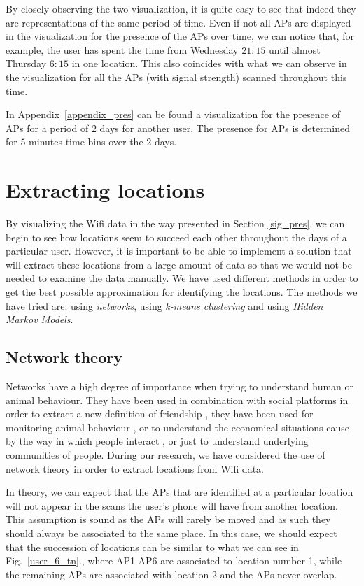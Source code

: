 By closely observing the two visualization, it is quite easy to see that indeed
they are representations of the same period of time. Even if not all APs are
displayed in the visualization for the presence of the APs over time, we can
notice that, for example, the user has spent the time from Wednesday $21:15$
until almost Thursday $6:15$ in one location. This also coincides with what we
can observe in the visualization for all the APs (with signal strength) scanned
throughout this time.

In Appendix~\ref{appendix_pres} can be found a visualization for the presence
of APs for a period of $2$ days for another user. The presence for APs is determined for $5$
minutes time bins over the $2$ days.

\section{Extracting locations}

By visualizing the Wifi data in the way presented in Section \ref{sig_pres}, we
can begin to see how locations seem to succeed each other throughout the days of
a particular user. However, it is important to be able to implement a solution
that will extract these locations from a large amount of data so that we would
not be needed to examine the data manually. We have used different methods in
order to get the best possible approximation for identifying the locations. The
methods we have tried are: using \textit{networks}, using \textit{k-means
clustering} and using \textit{Hidden Markov Models}.

\subsection{Network theory}

Networks have a high degree of importance when trying to understand human or
animal behaviour. They have been used in combination with social platforms in
order to extract a new definition of friendship \cite{cho2011friendship}, they
have been used for monitoring animal behaviour \cite{4116628}, or to understand
the economical situations cause by the way in which people interact
\cite{Copic05identifyingcommunity}, or just to understand underlying communities
of people. During our research, we have considered the use of network theory in
order to extract locations from Wifi data.

In theory, we can expect that the APs that are identified at a particular
location will not appear in the scans the user's phone will have from another
location. This assumption is sound as the APs will rarely be moved and as such
they should always be associated to the same place. In this case, we should
expect that the succession of locations can be similar to what we can see in
Fig.~\ref{user_6_tn}., where AP1-AP6 are associated to location number 1, while
the remaining APs are associated with location 2 and the APs never overlap.

